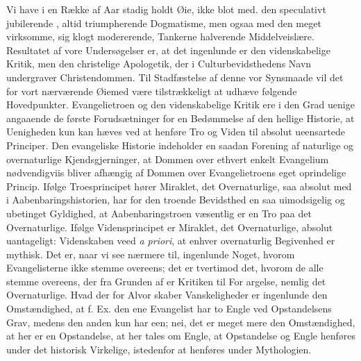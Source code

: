 \documentclass[12pt]{book}
\newcommand{\opage}[1]{\marginnote{\footnotesize\textit{[#1]}}}
\begin{document}
Vi have i en Række af Aar stadig holdt Øie, ikke blot
med. den speculativt jubilerende%
, altid triumpherende Dogmatisme,
men ogsaa med den meget virksomme, sig klogt modererende, Tankerne halverende Middelveislære. Resultatet af
vore Undersøgelser er, at det ingenlunde er den videnskabelige
Kritik, men den christelige Apologetik, der i Culturbevidsthedens
Navn undergraver Christendommen. Til Stadfæstelse
af denne vor Synsmaade vil det for vort nærværende Øiemed
være tilstrækkeligt at udhæve følgende Hovedpunkter.
Evangelietroen og den videnskabelige Kritik ere i den Grad
uenige angaaende de første Forudsætninger for en Bedømmelse
af den hellige Historie, at Uenigheden kun kan hæves
ved at henføre Tro og Viden til absolut ueensartede Principer.
Den evangeliske Historie indeholder en saadan Forening
af naturlige og overnaturlige Kjendsgjerninger, at
Dommen over ethvert enkelt Evangelium nødvendigviis bliver
afhængig af Dommen over Evangelietroens eget oprindelige
Princip. Ifølge Troesprincipet hører Miraklet, det Overnaturlige,
saa absolut med i Aabenbaringshistorien, har for
den troende Bevidsthed en saa uimodsigelig og ubetinget Gyldighed,
at Aabenbaringstroen væsentlig er en Tro paa det Overnaturlige.
Ifølge Vidensprincipet er Miraklet, det Overnaturlige,
absolut uantageligt: Videnskaben veed \textit{a priori}, at
enhver overnaturlig Begivenhed er mythisk. Det er, naar
vi see nærmere til, ingenlunde Noget, hvorom Evangelisterne
ikke stemme overeens; det er tvertimod det, hvorom de alle
stemme overeens, der fra Grunden af er Kritiken til For\-%
\opage{55}\setcounter{footnote}{0}%
argelse, nemlig det Overnaturlige. Hvad der for Alvor
skaber Vanskeligheder er ingenlunde den Omstændighed, at
f. Ex. den ene Evangelist har to Engle ved Opstandelsens
Grav, medens den anden kun har een; nei, det er meget
mere den Omstændighed, at her er en Opstandelse, at her
tales om Engle, at Opstandelse og Engle henføres under det
historisk Virkelige, istedenfor at henføres under Mythologien.
\end{document}
